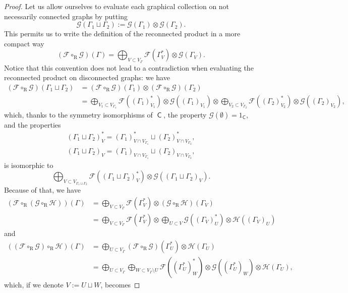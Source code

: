 \documentclass[11pt]{article}
\theoremstyle{definition}
\numberwithin{equation}{section}
\newcommand\calF{\mathcal{F}}
\newcommand\calG{\mathcal{G}}
\newcommand\calH{\mathcal{H}}
\DeclareMathOperator{\sfC}{\mathsf{C}}
\DeclareMathOperator{\rmR}{\mathrm{R}}
\begin{document}
\begin{proof}
Let us allow ourselves to evaluate each graphical collection on not necessarily connected graphs by putting 
 \[
\calG(\Gamma_1\sqcup\Gamma_2):=\calG(\Gamma_1)\otimes\calG(\Gamma_2).
 \]
This permits us to write the definition of the reconnected product in a more compact way
 \[
(\calF\circ_{\rmR}\calG)(\Gamma)=\bigoplus_{V\subset V_\Gamma}\calF(\Gamma^*_V)\otimes\calG(\Gamma_V).
 \]
Notice that this convention does not lead to a contradiction when evaluating the reconnected product on disconnected graphs: we have 
\begin{align*}
(\calF\circ_{\rmR}\calG)(\Gamma_1\sqcup\Gamma_2) &=
(\calF\circ_{\rmR}\calG)(\Gamma_1)\otimes (\calF\circ_{\rmR}\calG)(\Gamma_2)\\
&= \bigoplus_{V_1\subset V_{\Gamma_1}}\calF((\Gamma_1)^*_{V_1})\otimes\calG((\Gamma_1)_{V_1})\otimes
\bigoplus_{V_2\subset V_{\Gamma_2}}\calF((\Gamma_2)^*_{V_2})\otimes\calG((\Gamma_2)_{V_2}),
\end{align*}
which, thanks to the symmetry isomorphisms of $\sfC$, the property $\calG(\emptyset)=1_{\sfC}$, and the properties
\begin{gather*}
(\Gamma_1\sqcup\Gamma_2)^*_{V}=(\Gamma_1)^*_{V\cap V_{\Gamma_1}}\sqcup (\Gamma_2)^*_{V\cap V_{\Gamma_2}},\\
(\Gamma_1\sqcup\Gamma_2)_{V}=(\Gamma_1)_{V\cap V_{\Gamma_1}}\sqcup (\Gamma_2)_{V\cap V_{\Gamma_2}},
\end{gather*}
is isomorphic to 
 \[
\bigoplus_{V\subset V_{\Gamma_1\sqcup\Gamma_2}}\calF((\Gamma_1\sqcup\Gamma_2)^*_{V})\otimes\calG((\Gamma_1\sqcup\Gamma_2)_{V}).
 \] 
Because of that, we have
\begin{align*}
(\calF\circ_{\rmR}(\calG\circ_{\rmR}\calH))(\Gamma) &=
\bigoplus_{V\subset V_\Gamma}\calF(\Gamma^*_V)\otimes(\calG\circ_{\rmR}\calH)(\Gamma_V)\\
&=
\bigoplus_{V\subset V_\Gamma}\calF(\Gamma^*_V)\otimes\bigoplus_{U\subset V}\calG((\Gamma_V)^*_U)\otimes\calH((\Gamma_V)_U)
\end{align*}
and
\begin{align*}
((\calF\circ_{\rmR}\calG)\circ_{\rmR}\calH)(\Gamma) &=
\bigoplus_{U\subset V_\Gamma}(\calF\circ_{\rmR}\calG)(\Gamma^*_U)\otimes\calH(\Gamma_U)\\
&= \bigoplus_{U\subset V_\Gamma}\bigoplus_{W\subset V_\Gamma\setminus U}
\calF((\Gamma^*_U)^*_W)\otimes\calG((\Gamma^*_U)_W)\otimes \calH(\Gamma_U),
\end{align*}
which, if we denote $V:=U\sqcup W$, becomes

\end{proof}
\end{document}

